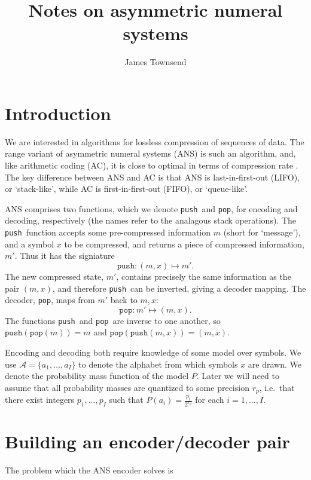 \documentclass{article}
\author{James Townsend}
\title{Notes on asymmetric numeral systems}
\newcommand{\push}{\texttt{push}}
\newcommand{\pop}{\texttt{pop}}
\begin{document}
\maketitle
\section{Introduction}
We are interested in algorithms for lossless compression of sequences of data.
The range variant of asymmetric numeral systems (ANS) is such an algorithm,
and, like arithmetic coding (AC), it is close to optimal in terms of
compression rate \citep{dudaAsymmetricNumeralSystems2009}. The key difference
between ANS and AC is that ANS is last-in-first-out (LIFO), or `stack-like',
while AC is first-in-first-out (FIFO), or `queue-like'.

ANS comprises two functions, which we denote \push\ and \pop, for encoding and
decoding, respectively (the names refer to the analagous stack operations). The
\push\ function accepts some pre-compressed information $m$ (short for
`message'), and a symbol $x$ to be compressed, and returns a piece of
compressed information, $m'$. Thus it has the signiature
\begin{equation}
  \push:(m, x) \mapsto m'.
\end{equation}
The new compressed state, $m'$, contains precisely the same information as the
pair $(m, x)$, and therefore \push\ can be inverted, giving a decoder mapping.
The decoder, \pop, maps from $m'$ back to $m, x$:
\begin{equation}
  \pop:m' \mapsto (m, x).
\end{equation}
The functions \push\ and \pop\ are inverse to one another, so
$\push(\pop(m))=m$ and $\pop(\push(m, x)) = (m, x)$.

Encoding and decoding both require knowledge of some model over symbols. We use
$\mathcal{A} = \{a_1, \ldots, a_I\}$ to denote the alphabet from which symbols
$x$ are drawn. We denote the probability mass function of the model $P$. Later
we will need to assume that all probability masses are quantized to some
precision $r_p$, i.e.\ that there exist integers $p_1, \ldots, p_I$ such that
$P(a_i) = \frac{p_i}{2^{r_p}}$ for each $i = 1,\ldots,I$.

\section{Building an encoder/decoder pair}
The problem which the ANS encoder solves is
\end{document}
